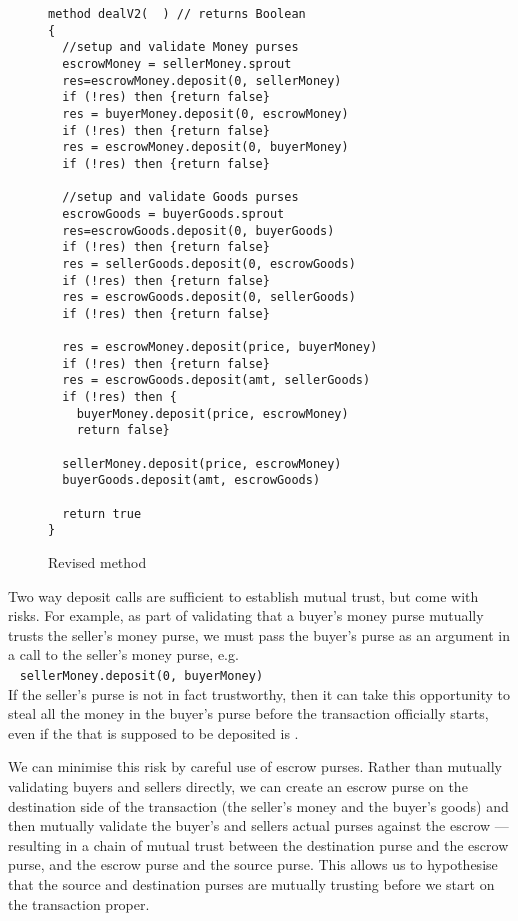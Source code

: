 \begin{figure}[htb]
\begin{lstlisting}
method dealV2(  ) // returns Boolean
{
  //setup and validate Money purses
  escrowMoney = sellerMoney.sprout
  res=escrowMoney.deposit(0, sellerMoney)
  if (!res) then {return false}
  res = buyerMoney.deposit(0, escrowMoney)
  if (!res) then {return false}
  res = escrowMoney.deposit(0, buyerMoney)
  if (!res) then {return false}

  //setup and validate Goods purses
  escrowGoods = buyerGoods.sprout
  res=escrowGoods.deposit(0, buyerGoods)
  if (!res) then {return false}
  res = sellerGoods.deposit(0, escrowGoods)
  if (!res) then {return false}
  res = escrowGoods.deposit(0, sellerGoods)
  if (!res) then {return false}

  res = escrowMoney.deposit(price, buyerMoney)
  if (!res) then {return false}
  res = escrowGoods.deposit(amt, sellerGoods)
  if (!res) then {
    buyerMoney.deposit(price, escrowMoney)
    return false}

  sellerMoney.deposit(price, escrowMoney)
  buyerGoods.deposit(amt, escrowGoods)

  return true
}
\end{lstlisting}
\vspace*{-7mm}
\caption{Revised  method}
\label{fig:DealV2}
\end{figure}


Two way deposit calls are sufficient to establish mutual trust,
but come with risks.
For example, as part of
validating that a buyer's money purse mutually trusts the seller's
money purse, we must  pass the buyer's purse
as an argument in a
 call to the seller's money purse, e.g.\\
%
~ \SP \lstinline+sellerMoney.deposit(0, buyerMoney)+\\
%
\noindent
If the seller's purse is not in fact trustworthy, then it can take this
opportunity to steal all the money in the buyer's purse before the
transaction officially starts, even if the  that is supposed
to be deposited is .

We can minimise this risk by careful use of escrow purses. Rather than
mutually validating buyers and sellers directly, we can create an escrow
purse on the destination side of the transaction (the seller's money
and the buyer's goods) and then mutually validate the buyer's and
sellers actual purses against the escrow --- resulting in a chain of
mutual trust between the destination purse and the escrow purse, and
the escrow purse and the source purse. This allows us to hypothesise
that the source and destination purses are mutually trusting before we
start on the transaction proper.


